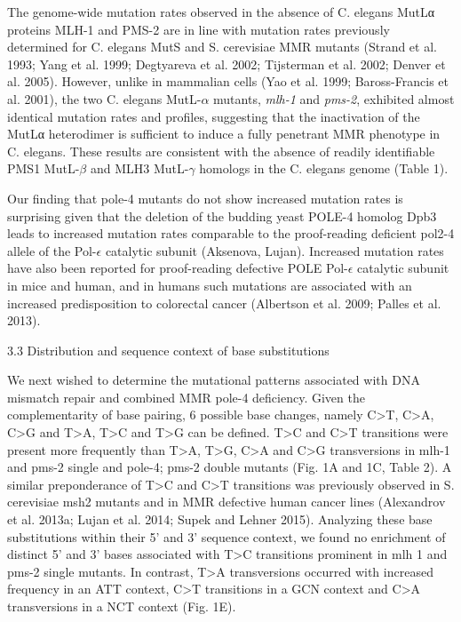 The genome-wide mutation rates observed in the absence of C. elegans MutLα proteins MLH-1 and PMS-2 are 
in line with mutation rates previously determined for C. elegans MutS and S. cerevisiae MMR mutants 
(Strand et al. 1993; Yang et al. 1999; Degtyareva et al. 2002; Tijsterman et al. 2002; Denver et al. 2005). 
However, unlike in mammalian cells (Yao et al. 1999; Baross-Francis et al. 2001), the two C. elegans 
MutL-$\alpha$ mutants, \textit{mlh-1} and \textit{pms-2}, exhibited almost identical mutation rates 
and profiles, suggesting that the inactivation of the MutLα heterodimer is sufficient to induce a 
fully penetrant MMR phenotype in C. elegans. These results are consistent with the absence of 
readily identifiable PMS1 MutL-$\beta$ and MLH3 MutL-$\gamma$ homologs in the C. elegans genome (Table 1).


Our finding that pole-4 mutants do not show increased mutation rates is surprising given that the 
deletion of the budding yeast POLE-4 homolog Dpb3 leads to increased mutation rates comparable to 
the proof-reading deficient pol2-4 allele of the Pol-$\epsilon$ catalytic subunit (Aksenova, Lujan). 
Increased mutation rates have also been reported for proof-reading defective POLE Pol-$\epsilon$ 
catalytic subunit in mice and human, and in humans such mutations are associated with an 
increased predisposition to colorectal cancer (Albertson et al. 2009; Palles et al. 2013). 


3.3 Distribution and sequence context of base substitutions


We next wished to determine the mutational patterns associated with 
DNA mismatch repair and combined MMR pole-4 deficiency. Given the 
complementarity of base pairing, 6 possible base changes, namely C>T, C>A, C>G and T>A, 
T>C and T>G can be defined. T>C and C>T transitions were present more frequently 
than T>A, T>G, C>A and C>G transversions in mlh-1 and pms-2 single and pole-4; pms-2 
double mutants (Fig. 1A and 1C, Table 2). A similar preponderance of T>C and C>T 
transitions was previously observed in S. cerevisiae msh2 mutants and in MMR defective 
human cancer lines (Alexandrov et al. 2013a; Lujan et al. 2014; Supek and Lehner 2015). 
Analyzing these base substitutions within their 5’ and 3’ sequence context, we found 
no enrichment of distinct 5’ and 3’ bases associated with T>C transitions prominent 
in mlh 1 and pms-2 single mutants. In contrast, T>A transversions occurred with 
increased frequency in an ATT context, C>T transitions in a GCN context and C>A 
transversions in a NCT context (Fig. 1E). 

